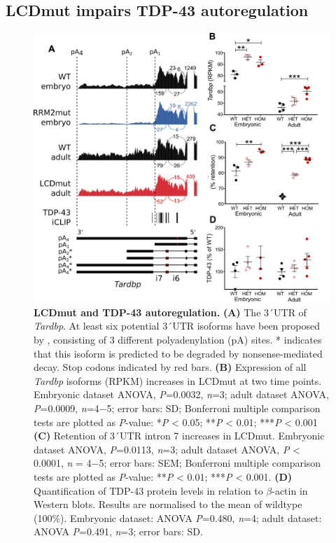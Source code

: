 \subsection{LCDmut impairs TDP-43 autoregulation}

\begin{figure}[h!]
	\centering
	\includegraphics[width=\textwidth]{Figures/05_tdp_mice/autoregulation.png}
	\caption[LCDmut and TDP-43 autoregulation]{
		\textbf{LCDmut and TDP-43 autoregulation.}
	\textbf{(A)} The 3\'\ UTR of \textit{Tardbp}. At least six potential 3\'\ UTR isoforms have been proposed by \citep{Koyama2016}, consisting of 3 different polyadenylation (pA) sites. * indicates that this isoform is predicted to be degraded by nonsense-mediated decay. Stop codons indicated by red bars. 
	\textbf{(B)} Expression of all \textit{Tardbp} isoforms (RPKM) increases in LCDmut at two time points.  Embryonic dataset ANOVA, \textit{P}=0.0032, \textit{n}=3; adult dataset ANOVA, \textit{P}=0.0009, \textit{n}=4$-$5; error bars: SD; Bonferroni multiple comparison tests are plotted as \textit{P}-value: *\textit{P} < 0.05; **\textit{P} < 0.01; ***\textit{P} < 0.001
	\textbf{(C)} Retention of 3\'\ UTR intron 7 increases in LCDmut. Embryonic dataset ANOVA, \textit{P}=0.0113, \textit{n}=3; adult dataset ANOVA, \textit{P} < 0.0001, \textit{n} = 4$-$5; error bars: SEM; Bonferroni multiple comparison tests are plotted as \textit{P}-value: **\textit{P} < 0.01; ***\textit{P} < 0.001.
	\textbf{(D)} Quantification of TDP-43 protein levels in relation to $\beta$-actin in Western blots. Results are normalised to the mean of wildtype (100\%). Embryonic dataset: ANOVA \textit{P}=0.480, \textit{n}=4; adult dataset: ANOVA \textit{P}=0.491, \textit{n}=3; error bars: SD.
}
	\label{fig:autoregulation}
\end{figure}

